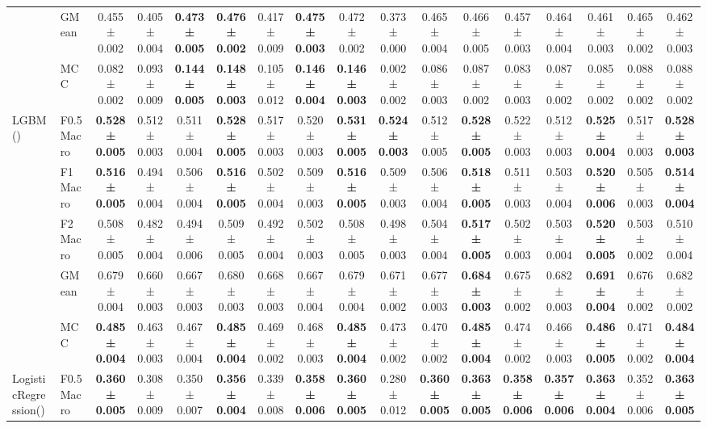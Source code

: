 \begin{table}[H]
{\begin{tabular}{llccccccccccccccc}
 & GMean & 0.455 ± 0.002 & 0.405 ± 0.004 & \textbf{0.473 ± 0.005} & \textbf{0.476 ± 0.002} & 0.417 ± 0.009 & \textbf{0.475 ± 0.003} & 0.472 ± 0.002 & 0.373 ± 0.000 & 0.465 ± 0.004 & 0.466 ± 0.005 & 0.457 ± 0.003 & 0.464 ± 0.004 & 0.461 ± 0.003 & 0.465 ± 0.002 & 0.462 ± 0.003 \\
 & MCC & 0.082 ± 0.002 & 0.093 ± 0.009 & \textbf{0.144 ± 0.005} & \textbf{0.148 ± 0.003} & 0.105 ± 0.012 & \textbf{0.146 ± 0.004} & \textbf{0.146 ± 0.003} & 0.002 ± 0.002 & 0.086 ± 0.003 & 0.087 ± 0.002 & 0.083 ± 0.003 & 0.087 ± 0.002 & 0.085 ± 0.002 & 0.088 ± 0.002 & 0.088 ± 0.002 \\
\cline{1-17}
\multirow[t]{5}{*}{LGBM()} & F0.5 Macro & \textbf{0.528 ± 0.005} & 0.512 ± 0.003 & 0.511 ± 0.004 & \textbf{0.528 ± 0.005} & 0.517 ± 0.003 & 0.520 ± 0.003 & \textbf{0.531 ± 0.005} & \textbf{0.524 ± 0.003} & 0.512 ± 0.005 & \textbf{0.528 ± 0.005} & 0.522 ± 0.003 & 0.512 ± 0.003 & \textbf{0.525 ± 0.004} & 0.517 ± 0.003 & \textbf{0.528 ± 0.003} \\
 & F1 Macro & \textbf{0.516 ± 0.005} & 0.494 ± 0.004 & 0.506 ± 0.004 & \textbf{0.516 ± 0.005} & 0.502 ± 0.004 & 0.509 ± 0.003 & \textbf{0.516 ± 0.005} & 0.509 ± 0.003 & 0.506 ± 0.004 & \textbf{0.518 ± 0.005} & 0.511 ± 0.003 & 0.503 ± 0.004 & \textbf{0.520 ± 0.006} & 0.505 ± 0.003 & \textbf{0.514 ± 0.004} \\
 & F2 Macro & 0.508 ± 0.005 & 0.482 ± 0.004 & 0.494 ± 0.006 & 0.509 ± 0.005 & 0.492 ± 0.004 & 0.502 ± 0.003 & 0.508 ± 0.005 & 0.498 ± 0.003 & 0.504 ± 0.004 & \textbf{0.517 ± 0.005} & 0.502 ± 0.003 & 0.503 ± 0.004 & \textbf{0.520 ± 0.005} & 0.503 ± 0.002 & 0.510 ± 0.004 \\
 & GMean & 0.679 ± 0.004 & 0.660 ± 0.003 & 0.667 ± 0.003 & 0.680 ± 0.003 & 0.668 ± 0.003 & 0.667 ± 0.004 & 0.679 ± 0.004 & 0.671 ± 0.002 & 0.677 ± 0.003 & \textbf{0.684 ± 0.003} & 0.675 ± 0.002 & 0.682 ± 0.003 & \textbf{0.691 ± 0.004} & 0.676 ± 0.002 & 0.682 ± 0.002 \\
 & MCC & \textbf{0.485 ± 0.004} & 0.463 ± 0.003 & 0.467 ± 0.004 & \textbf{0.485 ± 0.004} & 0.469 ± 0.002 & 0.468 ± 0.003 & \textbf{0.485 ± 0.004} & 0.473 ± 0.002 & 0.470 ± 0.002 & \textbf{0.485 ± 0.004} & 0.474 ± 0.002 & 0.466 ± 0.003 & \textbf{0.486 ± 0.005} & 0.471 ± 0.002 & \textbf{0.484 ± 0.004} \\
\cline{1-17}
\multirow[t]{5}{*}{LogisticRegression()} & F0.5 Macro & \textbf{0.360 ± 0.005} & 0.308 ± 0.009 & 0.350 ± 0.007 & \textbf{0.356 ± 0.004} & 0.339 ± 0.008 & \textbf{0.358 ± 0.006} & \textbf{0.360 ± 0.005} & 0.280 ± 0.012 & \textbf{0.360 ± 0.005} & \textbf{0.363 ± 0.005} & \textbf{0.358 ± 0.006} & \textbf{0.357 ± 0.006} & \textbf{0.363 ± 0.004} & 0.352 ± 0.006 & \textbf{0.363 ± 0.005} \\

\end{tabular}}
\end{table}
